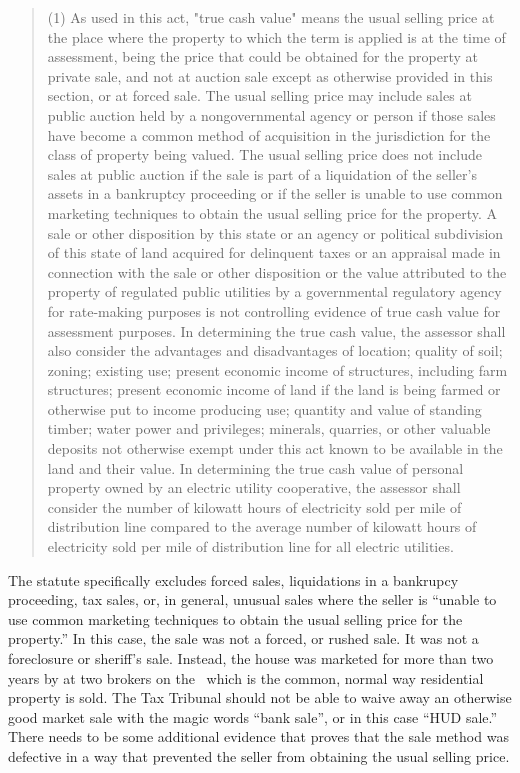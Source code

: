 \documentclass[12pt,\documentclassflag]{michiganCourtOfAppealsBrief}
\begin{document}
\begin{quote}
  (1) As used in this act, "true cash value" means the usual selling price at the place where the property to which the term is applied is at the time of assessment, being the price that could be obtained for the property at private sale, and not at auction sale except as otherwise provided in this section, or at forced sale. The usual selling price may include sales at public auction held by a nongovernmental agency or person if those sales have become a common method of acquisition in the jurisdiction for the class of property being valued. The usual selling price does not include sales at public auction if the sale is part of a liquidation of the seller's assets in a bankruptcy proceeding or if the seller is unable to use common marketing techniques to obtain the usual selling price for the property. A sale or other disposition by this state or an agency or political subdivision of this state of land acquired for delinquent taxes or an appraisal made in connection with the sale or other disposition or the value attributed to the property of regulated public utilities by a governmental regulatory agency for rate-making purposes is not controlling evidence of true cash value for assessment purposes. In determining the true cash value, the assessor shall also consider the advantages and disadvantages of location; quality of soil; zoning; existing use; present economic income of structures, including farm structures; present economic income of land if the land is being farmed or otherwise put to income producing use; quantity and value of standing timber; water power and privileges; minerals, quarries, or other valuable deposits not otherwise exempt under this act known to be available in the land and their value. In determining the true cash value of personal property owned by an electric utility cooperative, the assessor shall consider the number of kilowatt hours of electricity sold per mile of distribution line compared to the average number of kilowatt hours of electricity sold per mile of distribution line for all electric utilities.
\end{quote}

The statute specifically excludes forced sales, liquidations in a bankrupcy proceeding, tax sales, or, in general, unusual sales where the seller is ``unable to use common marketing techniques to obtain the usual selling price for the property.'' In this case, the sale was not a forced, or rushed sale. It was not a foreclosure or sheriff's sale. Instead, the house was marketed for more than two years by at two brokers on the \MLS\ which is the common, normal way residential property is sold. The Tax Tribunal should not be able to waive away an otherwise good market sale with the magic words ``bank sale'', or in this case ``HUD sale.'' There needs to be some additional evidence that proves that the sale method was defective in a way that prevented the seller from obtaining the usual selling price.
\end{document}
